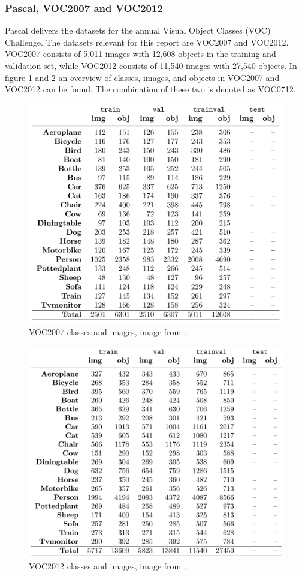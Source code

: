 \subsubsection{Pascal, VOC2007 and VOC2012}
Pascal delivers the datasets for the annual Visual Object Classes (VOC) Challenge. The datasets relevant for this report are VOC2007 and VOC2012. VOC2007 consists of 5,011 images with 12,608 objects in the training and validation set, while VOC2012 consists of  11,540 images with 27,540 objects. In figure \ref{fig:VOC2007} and \ref{fig:VOC2012} an overview of classes, images, and objects in VOC2007 and VOC2012 can be found. The combination of these two is denoted as VOC0712.


\begin{figure}[h!]
    \centering
    \includegraphics[width=0.55 \textwidth]{fig/VOC2007.png}
    \caption{VOC2007 classes and images, image from \citep{Everingham2007}.}
    \label{fig:VOC2007}
\end{figure}

\begin{figure}[h!]
    \centering
    \includegraphics[width=0.55 \textwidth]{fig/VOC2012.png}
    \caption{VOC2012 classes and images, image from \citep{Everingham2012}.}
    \label{fig:VOC2012}
\end{figure}

